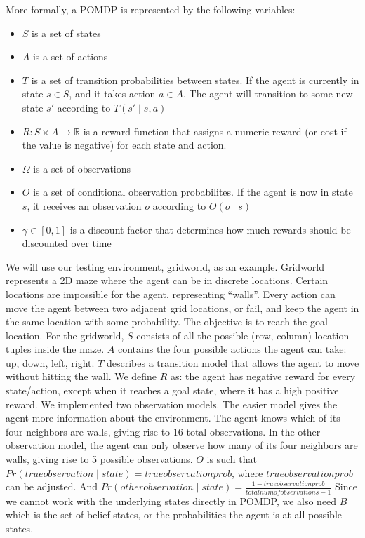 \documentclass{pset}
\begin{document}
More formally, a POMDP is represented by the following variables: 

\begin{itemize}
\item $S$ is a set of states
\item $A$ is a set of actions
\item $T$ is a set of transition probabilities between states. If the agent is currently in state $s
\in S$, and it takes action $a \in A$. The agent will transition to some new state $s'$ according to 
$T(s' \mid s,a)$
\item $R: S \times A \rightarrow \mathbb{R}$ is a reward function that assigns a numeric reward (or
cost if the value is negative) for each state and action. 
\item $\Omega$ is a set of observations
\item $O$ is a set of conditional observation probabilites. If the agent is now in state $s$, 
it receives an observation $o$ according to $O(o \mid s)$
\item $\gamma \in [0,1]$ is a discount factor that determines how much rewards should be discounted over time
\end{itemize}
 
We will use our testing environment, gridworld, as an example. 
Gridworld represents a 2D maze where the agent can be in discrete locations. Certain
locations are impossible for the agent, representing ``walls''. Every action can
move the agent between two adjacent grid locations, or fail, and keep the agent in
the same location with some probability. The objective is to reach the goal location. 
For the gridworld, $S$ consists of all the possible (row, column) location tuples inside the maze. 
$A$ contains the four possible actions the agent can take: up, down, left, right. 
$T$ describes a transition model that allows the agent to move without hitting the wall. 
We define $R$ as: the agent has negative reward for every state/action, except when it reaches a goal state, 
where it has a high positive reward.
We implemented two observation models. The easier model gives the agent more information about the
environment. The agent knows which of its four neighbors are walls, giving rise to 16 total
observations. In the other observation model, the agent can only observe how many of its four
neighbors are walls, giving rise to 5 possible observations. $O$ is such that 
$Pr(true observation \mid state)=true observation prob$, where $true observation prob$ can be adjusted.
And $Pr(other observation \mid state)=\frac{1-true observation prob}{total num of observations-1}$
Since we cannot work with the underlying states directly in POMDP, we also need $B$ which is the set
of belief states, or the probabilities the agent is at all possible states. 
\end{document}
